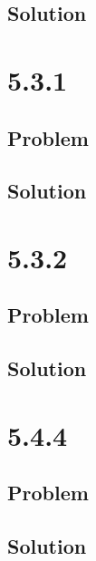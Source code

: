 \documentclass[12pt]{article}
\begin{document}
\subsection{Solution}

\newpage
\section{5.3.1}

\subsection{Problem}

\subsection{Solution}

\newpage
\section{5.3.2}

\subsection{Problem}

\subsection{Solution}

\newpage
\section{5.4.4}

\subsection{Problem}

\subsection{Solution}

\newpage


\nocite{El-Deeb_PEU-356_Assignments}
\end{document}
